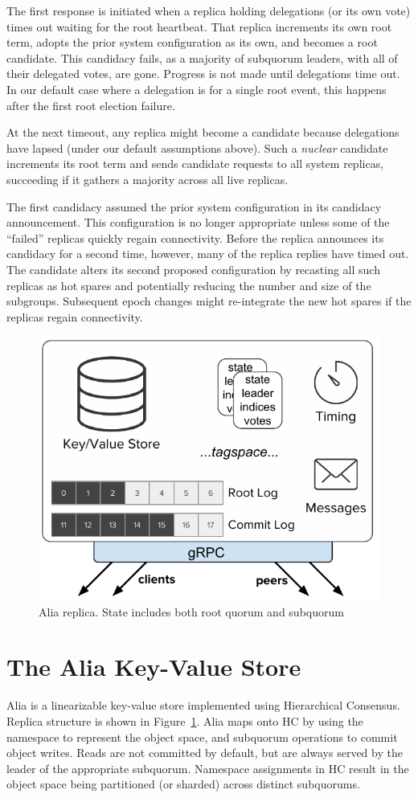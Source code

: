 \documentclass[letterpaper,10pt,twocolumn]{article}
\newcommand{\sub}{subquorum\xspace}
\newcommand{\subs}{subquorums\xspace}
\newcommand{\sys}{Alia\xspace}
\newcommand{\roo}{root quorum\xspace}
\begin{document}
The first response is initiated when a replica holding delegations (or its own
vote) times out waiting for the root heartbeat.
That replica increments its own root term, adopts the prior system
configuration as its own, and becomes a root candidate.
This candidacy fails, as a majority of \sub leaders, with all of their
delegated votes, are gone.
Progress is not made until delegations time out.
In our default case where a delegation is for a single root event, this
happens after the first root election failure.

At the next timeout, any replica might become a candidate because delegations have
lapsed (under our default assumptions above).
Such a \emph{nuclear} candidate increments its root term and
sends candidate requests to all system replicas,
succeeding if it gathers a majority across all live replicas.

The first candidacy assumed the prior system configuration in its candidacy
announcement.
This configuration is no longer appropriate unless some of the ``failed''
replicas quickly regain connectivity.
Before the replica announces its candidacy for a second time, however, many of
the replica replies have timed out.
The candidate alters its second proposed configuration by recasting all such
replicas as hot spares and potentially reducing the number and size of the
subgroups.
Subsequent epoch changes might re-integrate the new hot spares if the replicas
regain connectivity.

\begin{figure}[t]
  \centering
  \includegraphics[width=.45\textwidth]{figures/replica.pdf}
  \caption{\sys replica. State includes both \roo and \sub}
  \label{fig:replica}
\end{figure}

\section{The Alia Key-Value Store}
\label{sec:key-store}

\sys is a linearizable key-value store implemented using Hierarchical
Consensus.
Replica structure is shown in Figure~\ref{fig:replica}.
\sys maps onto HC by using the namespace to represent the object space, and
\sub operations to commit object writes.
Reads are not committed by default, but are always served by the leader of the
appropriate \sub.
Namespace assignments in HC result in the object space being partitioned (or
sharded) across distinct \subs.
\end{document}
